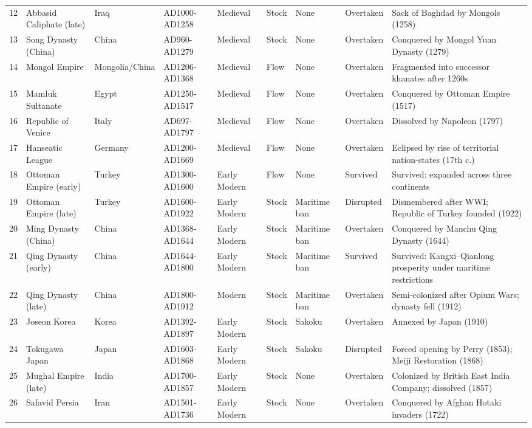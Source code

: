\documentclass[11pt]{article}
\begin{document}
\begin{longtable}{@{}r l l l l l l l p{5.5cm}@{}}
12 & Abbasid Caliphate (late) & Iraq & AD1000-AD1258 & Medieval & Stock & None & Overtaken & Sack of Baghdad by Mongols (1258) \\
13 & Song Dynasty (China) & China & AD960-AD1279 & Medieval & Stock & None & Overtaken & Conquered by Mongol Yuan Dynasty (1279) \\
14 & Mongol Empire & Mongolia/China & AD1206-AD1368 & Medieval & Flow & None & Overtaken & Fragmented into successor khanates after 1260s \\
15 & Mamluk Sultanate & Egypt & AD1250-AD1517 & Medieval & Flow & None & Overtaken & Conquered by Ottoman Empire (1517) \\
16 & Republic of Venice & Italy & AD697-AD1797 & Medieval & Flow & None & Overtaken & Dissolved by Napoleon (1797) \\
17 & Hanseatic League & Germany & AD1200-AD1669 & Medieval & Flow & None & Overtaken & Eclipsed by rise of territorial nation-states (17th c.) \\
18 & Ottoman Empire (early) & Turkey & AD1300-AD1600 & Early Modern & Flow & None & Survived & Survived: expanded across three continents \\
19 & Ottoman Empire (late) & Turkey & AD1600-AD1922 & Early Modern & Stock & Maritime ban & Disrupted & Dismembered after WWI; Republic of Turkey founded (1922) \\
20 & Ming Dynasty (China) & China & AD1368-AD1644 & Early Modern & Stock & Maritime ban & Overtaken & Conquered by Manchu Qing Dynasty (1644) \\
21 & Qing Dynasty (early) & China & AD1644-AD1800 & Early Modern & Stock & Maritime ban & Survived & Survived: Kangxi--Qianlong prosperity under maritime restrictions \\
22 & Qing Dynasty (late) & China & AD1800-AD1912 & Modern & Stock & Maritime ban & Overtaken & Semi-colonized after Opium Wars; dynasty fell (1912) \\
23 & Joseon Korea & Korea & AD1392-AD1897 & Early Modern & Stock & Sakoku & Overtaken & Annexed by Japan (1910) \\
24 & Tokugawa Japan & Japan & AD1603-AD1868 & Early Modern & Stock & Sakoku & Disrupted & Forced opening by Perry (1853); Meiji Restoration (1868) \\
25 & Mughal Empire (late) & India & AD1700-AD1857 & Early Modern & Stock & None & Overtaken & Colonized by British East India Company; dissolved (1857) \\
26 & Safavid Persia & Iran & AD1501-AD1736 & Early Modern & Stock & None & Overtaken & Conquered by Afghan Hotaki invaders (1722) \\

\end{longtable}
\end{document}
